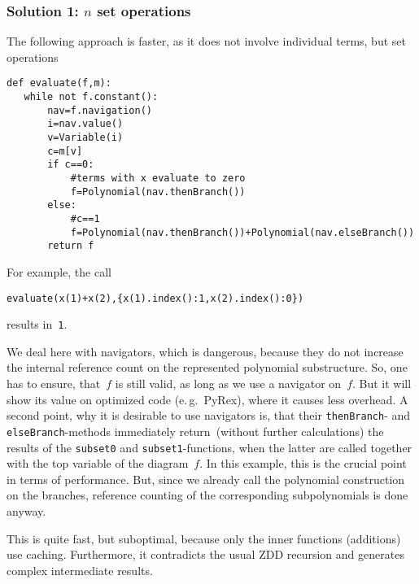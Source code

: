 \documentclass[]{article}
\begin{document}
\subsubsection{Solution 1: $n$ set operations}
The following approach is faster, as it does not involve individual terms, but set operations

\begin{verbatim}
def evaluate(f,m):
   while not f.constant():
       nav=f.navigation()
       i=nav.value()
       v=Variable(i)
       c=m[v]
       if c==0:
           #terms with x evaluate to zero
           f=Polynomial(nav.thenBranch())
       else:
           #c==1
           f=Polynomial(nav.thenBranch())+Polynomial(nav.elseBranch())
       return f   
\end{verbatim}
For example, the call
\begin{verbatim}
evaluate(x(1)+x(2),{x(1).index():1,x(2).index():0})  
\end{verbatim}
results in~\verb|1|.



We deal here with navigators, which is dangerous, because
they do not increase the internal reference count on the represented polynomial
substructure. So, one has
to ensure, that~$f$ is still valid, as long as we use a navigator on~$f$.
But it will show its value on optimized code (e.\,g.\ PyRex), where it causes
less overhead. 
A second point, why it is desirable to use navigators is, that their
\verb|thenBranch|- and \verb|elseBranch|-methods immediately return~(without
further calculations) the
results of the \verb|subset0| and \verb|subset1|-functions, when the latter are
called together  with the top variable of the diagram~$f$.
%
In this example, this is the crucial point in terms of performance.
But, since we already call the polynomial construction on the branches,
reference counting of the corresponding subpolynomials is done anyway.

This is quite fast, but suboptimal, because only the inner functions (additions) use caching.
%
Furthermore, it contradicts the usual ZDD recursion and generates complex intermediate results.
\end{document}
